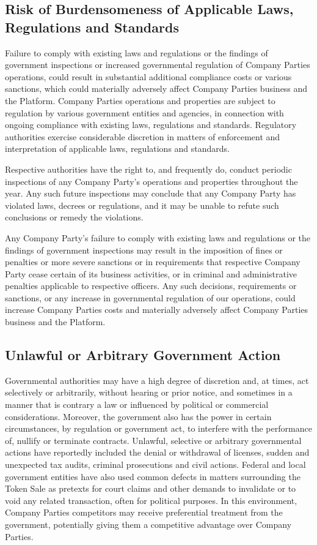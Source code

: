 \documentclass[12pt]{report}
\begin{document}
\subsection*{Risk of Burdensomeness of Applicable Laws, Regulations and Standards}
Failure to comply with existing laws and regulations or the findings of government inspections or increased governmental regulation of Company Parties operations, could result in substantial additional compliance costs or various sanctions, which could materially adversely affect Company Parties business and the Platform. Company Parties operations and properties are subject to regulation by various government entities and agencies, in connection with ongoing compliance with existing laws, regulations and standards. Regulatory authorities exercise
considerable discretion in matters of enforcement and interpretation of applicable laws, regulations and standards.

Respective authorities have the right to, and frequently do, conduct periodic inspections of any Company Party’s operations and properties throughout the year. Any such future inspections may conclude that any Company Party has violated laws, decrees or regulations, and it may be unable to refute such conclusions or remedy the violations.

Any Company Party’s failure to comply with existing laws and regulations or the findings of government inspections may result in the imposition of fines or penalties or more severe sanctions or in requirements that respective Company Party cease certain of its business activities, or in criminal and administrative penalties applicable to respective officers. Any such decisions, requirements or sanctions, or any increase in governmental regulation of our operations, could increase Company Parties costs and materially adversely affect Company Parties business
and the Platform.

\subsection*{Unlawful or Arbitrary Government Action}
Governmental authorities may have a high degree of discretion and, at times, act selectively or arbitrarily, without hearing or prior notice, and sometimes in a manner that is contrary a law or influenced by political or commercial considerations. Moreover, the government also has the power in certain circumstances, by regulation or government act, to interfere with the performance of, nullify or terminate contracts. Unlawful, selective or arbitrary governmental actions have reportedly included the denial or withdrawal of licenses, sudden and unexpected tax audits, criminal prosecutions and civil actions. Federal and local government entities have also used common defects in matters surrounding the Token Sale as pretexts for court claims and other demands to invalidate or to void any related transaction, often for political purposes. In this environment, Company Parties competitors may receive preferential treatment from the government, potentially giving them a competitive advantage over Company Parties.

\end{document}
